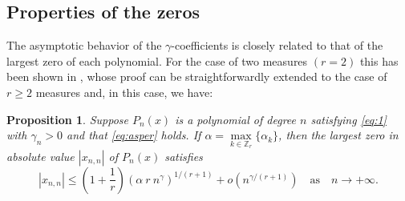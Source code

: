 \documentclass[12pt]{article}
\newtheorem{proposition}{Proposition}[section]
\numberwithin{equation}{section}
\begin{document}
\subsection{Properties of the zeros} 

 

The asymptotic behavior of the $\gamma$-coefficients is closely related to that of the largest zero of each polynomial. For the case of two measures $(r=2)$ this has been shown in \cite[Th. 2.6]{AnaWVA}, whose proof can be straightforwardly extended to the case of $r\geq 2$ measures and, in this case, we have:

\begin{proposition}\label{prop:max zero P} Suppose $P_n(x)$ is a polynomial of degree $n$ satisfying \eqref{eq:1} with $\gamma_n>0$ 
and that \eqref{eq:asper} holds. If $\alpha=\max\limits_{k\in\mathbb{Z}_r}\{\alpha_k\}$, then 
the largest zero in absolute value $|x_{n,n}|$ of $P_n(x)$ satisfies
\begin{equation}
	|x_{n,n}| \leq  \left( 1 + \frac{1}{r}\right) \left( \alpha\  r \ n^{\gamma} \right)^{1/(r+1)}+ o(n^{\gamma/(r+1)}) \quad \text{as}\quad n\to+\infty.
\end{equation}
\end{proposition}
\end{document}
